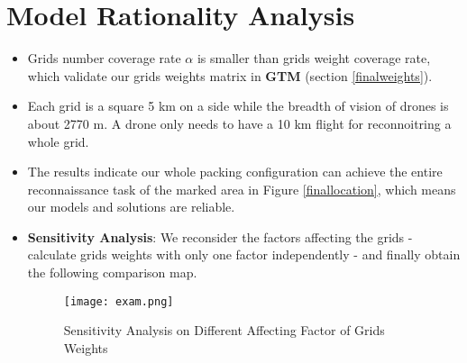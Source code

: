\documentclass{mcmthesis}
\begin{document}
    
    
    \section{Model Rationality  Analysis}
    
    \begin{itemize}
    	\item Grids number coverage rate $\alpha$ is smaller than grids weight coverage rate, which validate our grids weights matrix in \textbf{GTM} (section \ref{finalweights}).
    	\item Each grid is a square 5 km on a side while the breadth of vision of drones is about 2770 m. A drone only needs to have a 10 km flight for reconnoitring a whole grid.
    	\item The results indicate our whole packing configuration can achieve the entire reconnaissance task of the marked area in Figure \ref{finallocation}, which means our models and solutions are reliable.
    	\item \textbf{Sensitivity Analysis}: We reconsider the factors affecting the grids - calculate grids weights with only one factor independently - and finally obtain the following comparison map.
    	    \begin{figure}[H]                                         
    		\centering
    		\texttt{[image: exam.png]}        
    		\caption{Sensitivity Analysis on Different Affecting Factor of Grids Weights}                          
    		\label{pf}                                          
    	\end{figure}
    \end{itemize}
    
\end{document}
